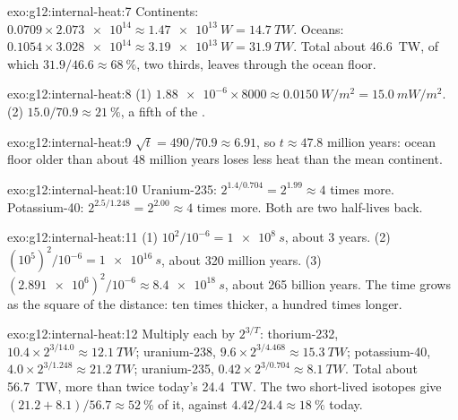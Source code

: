 \begin{solution}{exo:g12:internal-heat:7}
Continents: $0.0709 \times \num{2.073e14} \approx \qty{1.47e13}{W} =
\qty{14.7}{TW}$. Oceans: $0.1054 \times \num{3.028e14} \approx
\qty{3.19e13}{W} = \qty{31.9}{TW}$. Total about \qty{46.6}{TW}, of which
$31.9/46.6 \approx \qty{68}{\percent}$, two thirds, leaves through the ocean
floor.
\end{solution}

\begin{solution}{exo:g12:internal-heat:8}
(1) $\num{1.88e-6} \times 8000 \approx \qty{0.0150}{W/m^2} = \qty{15.0}{mW/m^2}$.
(2) $15.0/70.9 \approx \qty{21}{\percent}$, a fifth of the .
\end{solution}

\begin{solution}{exo:g12:internal-heat:9}
$\sqrt{t} = 490/70.9 \approx 6.91$, so $t \approx 47.8$ million years: ocean
floor older than about 48 million years loses less heat than the mean
continent.
\end{solution}

\begin{solution}{exo:g12:internal-heat:10}
Uranium-235: $2^{1.4/0.704} = 2^{1.99} \approx 4$ times more. Potassium-40:
$2^{2.5/1.248} = 2^{2.00} \approx 4$ times more. Both are two half-lives back.
\end{solution}

\begin{solution}{exo:g12:internal-heat:11}
(1) $10^2/10^{-6} = \qty{1e8}{s}$, about 3 years. (2) $(10^5)^2/10^{-6} =
\qty{1e16}{s}$, about 320 million years. (3) $(\num{2.891e6})^2/10^{-6}
\approx \qty{8.4e18}{s}$, about 265 billion years. The time grows as the
square of the distance: ten times thicker, a hundred times longer.
\end{solution}

\begin{solution}{exo:g12:internal-heat:12}
Multiply each by $2^{3/T}$: thorium-232, $10.4 \times 2^{3/14.0} \approx
\qty{12.1}{TW}$; uranium-238, $9.6 \times 2^{3/4.468} \approx \qty{15.3}{TW}$;
potassium-40, $4.0 \times 2^{3/1.248} \approx \qty{21.2}{TW}$; uranium-235,
$0.42 \times 2^{3/0.704} \approx \qty{8.1}{TW}$. Total about \qty{56.7}{TW},
more than twice today's \qty{24.4}{TW}. The two short-lived isotopes give
$(21.2 + 8.1)/56.7 \approx \qty{52}{\percent}$ of it, against
$4.42/24.4 \approx \qty{18}{\percent}$ today.
\end{solution}

